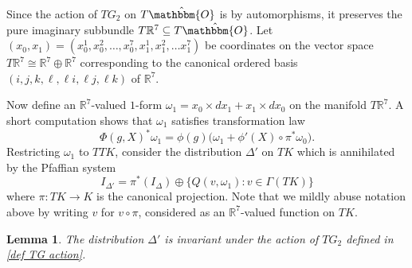 \documentclass[11pt,letterpaper]{amsart}
\newtheorem{lemma}[theorem]{Lemma}
\numberwithin{equation}{section}
\newcommand{\oct}{\hat{\mathbbm{O}}}
\begin{document}
Since the action of $TG_2$ on $T\oct$ is by automorphisms, it preserves the pure imaginary subbundle $T\mathbb{R}^7\subseteq T\oct$. Let $(x_0,x_1) = (x_0^1,x_0^2,\ldots, x_0^7,x_1^1,x_1^2,\ldots x_1^7)$ be coordinates on the vector space $T\mathbb{R}^7 \cong \mathbb{R}^7\oplus \mathbb{R}^7$ corresponding to the canonical ordered basis $(i,j,k,\ell,\ell i,\ell j, \ell k)$ of $\mathbb{R}^7$.

Now define an $\mathbb{R}^7$-valued $1$-form $\omega_1 = x_0\times dx_1 + x_1\times dx_0$ on the manifold $T\mathbb{R}^7$. A short computation shows that $\omega_1$ satisfies transformation law
\begin{equation}
    \label{omega_1 transformation law}
    \Phi(g,X)^*\omega_1 = \phi(g)\big(\omega_1 + \phi'(X)\circ \pi^*\omega_0\big).
\end{equation}
Restricting $\omega_1$ to $TTK$, consider the distribution $\Delta'$ on $TK$ which is annihilated by the Pfaffian system
\begin{equation}
\label{def I Delta'}
    I_{\Delta'}= \pi^*(I_\Delta)\oplus\{Q(v,\omega_1): v\in \Gamma(TK)\} 
\end{equation}
where $\pi:TK\to K$ is the canonical projection. Note that we mildly abuse notation above by writing $v$ for $v\circ \pi$, considered as an $\mathbb{R}^7$-valued function on $TK$.
\begin{lemma}
    \label{lemma: TG2 invar}
    The distribution $\Delta'$ is invariant under the action of $TG_2$ defined in \eqref{def TG action}.
\end{lemma}
\end{document}

